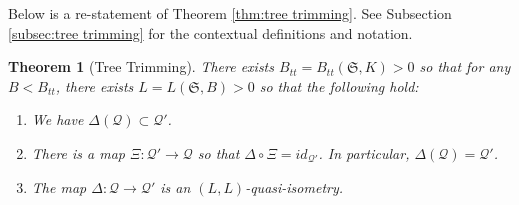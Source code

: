 \documentclass{amsart}
\newtheorem{theorem}{Theorem}[section]
\theoremstyle{definition}
\theoremstyle{remark}
\theoremstyle{definition}
\newcommand{\calQ}{\mathcal{Q}}
\begin{document}
Below is a re-statement of Theorem \ref{thm:tree trimming}.  See Subsection \ref{subsec:tree trimming} for the contextual definitions and notation.

\begin{theorem}[Tree Trimming]
There exists $B_{tt} = B_{tt}(\mathfrak S, K)>0$ so that for any $B < B_{tt}$, there exists $L =L(\mathfrak S, B)>0$ so that the following hold:

\begin{enumerate}
\item We have $\Delta(\calQ) \subset \calQ'$.
\item There is a map $\Xi:\calQ' \to \calQ$ so that $\Delta \circ \Xi = id_{\calQ'}$.  In particular, $\Delta(\calQ) = \calQ'$.
\item The map $\Delta:\calQ \to \calQ'$ is an $(L,L)$-quasi-isometry.
\end{enumerate}
\end{theorem}
\end{document}
